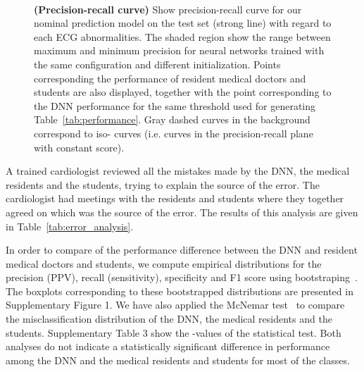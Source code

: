 \documentclass{article}
\begin{document}
\begin{figure*}[h]
    \centering
    \\
    \caption{\textbf{(Precision-recall curve)} Show precision-recall curve for our nominal prediction model on the test set (strong line) with regard to each ECG abnormalities. The shaded region show the range between maximum and minimum precision for neural networks trained with the same configuration and different initialization. Points corresponding the performance of resident medical doctors and students are also displayed, together with the point corresponding to the DNN performance for the same threshold used for generating Table~\ref{tab:performance}. Gray dashed curves in the background correspond to iso- curves (i.e. curves in the precision-recall plane with constant  score).}
    \label{fig:precision_recall}
\end{figure*}


A trained cardiologist reviewed all the mistakes made by the DNN, the medical residents and the students, trying to explain the source of the error. The cardiologist had meetings with the residents and students where they together agreed on which was the source of the error. The results of this analysis are given in Table~\ref{tab:error_analysis}.

In order to compare of the performance difference between the DNN and resident medical doctors and students, we compute empirical distributions for the precision (PPV), recall (sensitivity), specificity and F1 score using bootstraping~\cite{efron_introduction_1994}.  The boxplots corresponding to these bootstrapped distributions are presented in Supplementary Figure 1. We have also applied the McNemar test~\cite{mcnemar_note_1947} to compare the misclassification distribution of the DNN, the medical residents and the students. Supplementary Table 3 show the -values of the statistical test. Both analyses do not indicate a statistically significant difference in performance among the DNN and the medical residents and students for most of the classes. 
\end{document}
